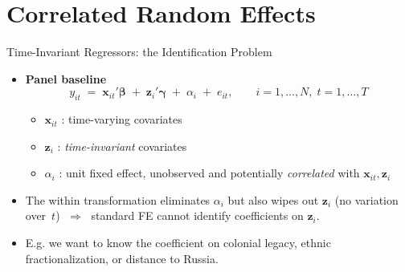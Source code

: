 \documentclass[aspectratio=169, handout, t]{beamer}
\numberwithin{equation}{section}
\begin{document}
\section{Correlated Random Effects}
\begin{frame}{Time-Invariant Regressors: the Identification Problem}
\begin{itemize}
  \item[] \textbf{Panel baseline}  
    \[
      y_{it} \;=\; \bm{x}_{it}'\bm{\beta} \;+\; \bm{z}_{i}'\bm{\gamma}
      \;+\; \alpha_i \;+\; e_{it},
      \qquad i=1,\dots,N,\; t=1,\dots,T
    \]
    \begin{itemize}
      \item $\bm{x}_{it}$ : time-varying covariates  
      \item $\bm{z}_{i}$  : \textit{time-invariant} covariates  
      \item $\alpha_i$    : unit fixed effect, unobserved and potentially \emph{correlated} with $\bm{x}_{it},\bm{z}_{i}$
    \end{itemize}\pause
  \item The \alert{within transformation} eliminates $\alpha_i$ but also wipes out
        $\bm{z}_{i}$ (no variation over~$t$) $\;\Rightarrow\;$ standard FE cannot identify coefficients on $\bm{z}_{i}$.
  \item E.g. we want to know the coefficient on colonial legacy, ethnic fractionalization, or distance to Russia.
\end{itemize}
\end{frame}
\end{document}
